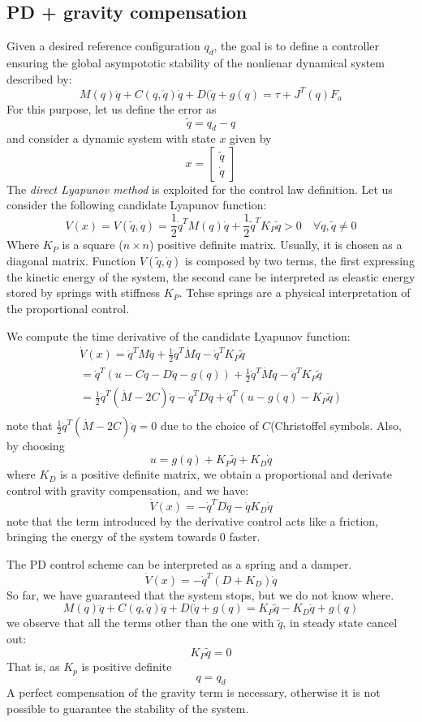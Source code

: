 \documentclass{book}
\begin{document}
\subsection{PD + gravity compensation}
Given a desired reference configuration $q_d$, the goal is to define a controller ensuring the global asympototic stability of the nonlienar dynamical system described by:
\[
    M(q)\ddot{q}+C(q,\dot{q})\dot{q}+D(\dot{q}+g(q) = \tau + J^T(q)F_a
\]
For this purpose, let us define the error as
\[
    \tilde{q}=q_d-q
\]
and consider a dynamic system with state $x$ given by
\[
    x=\begin{bmatrix}
        \tilde{q}\\\dot{q}
    \end{bmatrix}
\]
The \emph{direct Lyapunov method} is exploited for the control law definition.
Let us consider the following candidate Lyapunov function:
\[
    V(x) = V(\tilde{q},\dot{q}) = \frac{1}{2}\dot{q}^TM(q)\dot{q}+\frac{1}{2}\tilde{q}^TK_P\tilde{q}>0 \quad \forall \dot{q},\tilde{q} \neq 0
\]
Where $K_P$ is a square ($n\times n$) positive definite matrix. Usually, it is chosen as a diagonal matrix. Function $V(\tilde{q},\dot{q})$ is composed by two terms, the first expressing the kinetic energy of the system, the second cane be interpreted as eleastic energy stored by springs with stiffness $K_P$. Tehse springs are a physical interpretation of the proportional control.

We compute the time derivative of the candidate Lyapunov function:
\begin{gather*}
    \dot{V}(x)=\dot{q}^TM\ddot{q}+\frac{1}{2}\dot{q}^T\dot{M}\dot{q}-\dot{q}^TK_P\tilde{q}\\
    =\dot{q}^T(u-C\dot{q}-D\dot{q}-g(q))+\frac{1}{2}\dot{q}^T\dot{M}\dot{q}-\dot{q}^TK_P\tilde{q}\\
    =\frac{1}{2}\dot{q}^T(\dot{M}-2C)\dot{q}-\dot{q}^TD\dot{q}+\dot{q}^T(u-g(q)-K_P\tilde{q})\\
\end{gather*}
note that $\frac{1}{2}\dot{q}^T(\dot{M}-2C)\dot{q}=0$ due to the choice of $C$(Christoffel symbols. Also, by choosing
\[
    u=g(q)+K_P\tilde{q}+K_D\dot{q}
\]
where $K_D$ is a positive definite matrix, we obtain a proportional and derivate control with gravity compensation, and we have:
\[
    \dot{V}(x)=-\dot{q}^TD\dot{q}-\dot{q}K_D\dot{q}
\]
note that the term introduced by the derivative control acts like a friction, bringing the energy of the system towards 0 faster.

The PD control scheme can be interpreted as a spring and a damper.
\[
    \dot{V}(x)=-\dot{q}^T(D+K_D)\dot{q}
\]
So far, we have guaranteed that the system stops, but we do not know where.
\[
    M(q)\ddot{q}+C(q,\dot{q})\dot{q}+D(\dot{q}+g(q) = K_P\tilde{q}-K_D\dot{q}+g(q) 
\]
we observe that all the terms other than the one with $\tilde{q}$, in steady state cancel out:
\[
    K_P\tilde{q} = 0
\]
That is, as $K_p$ is positive definite
\[
    q=q_d
\]
A perfect compensation of the gravity term is necessary, otherwise it is not possible to guarantee the stability of the system.
\end{document}
